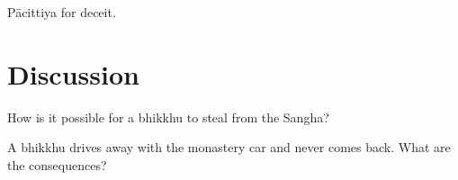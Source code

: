 \begin{exam}{\autoExamName}
\begin{problem*}
\begin{parts}
  \begin{solution}
    Pācittiya for deceit.
  \end{solution}

\end{parts}

\end{problem*}

\section*{Discussion}

How is it possible for a bhikkhu to steal from the Sangha?

\bigskip

A bhikkhu drives away with the monastery car and never comes back.
What are the consequences?

\end{exam}
